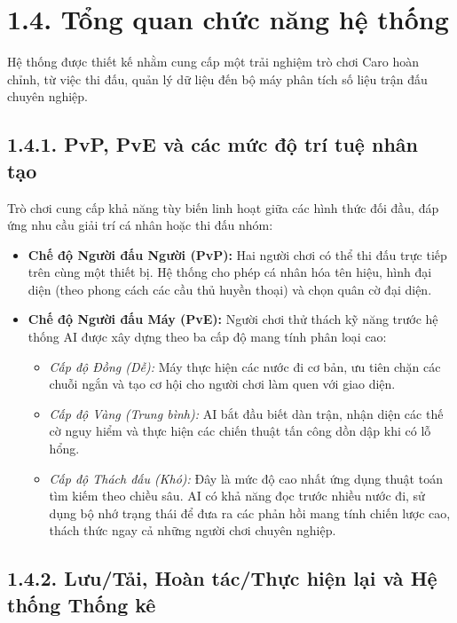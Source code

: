 \section*{1.4. Tổng quan chức năng hệ thống}

\noindent \indent Hệ thống được thiết kế nhằm cung cấp một trải nghiệm trò chơi Caro hoàn chỉnh, từ việc thi đấu, quản lý dữ liệu đến bộ máy phân tích số liệu trận đấu chuyên nghiệp.

\subsection*{1.4.1. PvP, PvE và các mức độ trí tuệ nhân tạo}

\noindent \indent Trò chơi cung cấp khả năng tùy biến linh hoạt giữa các hình thức đối đầu, đáp ứng nhu cầu giải trí cá nhân hoặc thi đấu nhóm:

\begin{itemize}
    \item \textbf{Chế độ Người đấu Người (PvP):} Hai người chơi có thể thi đấu trực tiếp trên cùng một thiết bị. Hệ thống cho phép cá nhân hóa tên hiệu, hình đại diện (theo phong cách các cầu thủ huyền thoại) và chọn quân cờ đại diện.
    \item \textbf{Chế độ Người đấu Máy (PvE):} Người chơi thử thách kỹ năng trước hệ thống AI được xây dựng theo ba cấp độ mang tính phân loại cao:
    \begin{itemize}
        \item \textit{Cấp độ Đồng (Dễ):} Máy thực hiện các nước đi cơ bản, ưu tiên chặn các chuỗi ngắn và tạo cơ hội cho người chơi làm quen với giao diện.
        \item \textit{Cấp độ Vàng (Trung bình):} AI bắt đầu biết dàn trận, nhận diện các thế cờ nguy hiểm và thực hiện các chiến thuật tấn công dồn dập khi có lỗ hổng.
        \item \textit{Cấp độ Thách đấu (Khó):} Đây là mức độ cao nhất ứng dụng thuật toán tìm kiếm theo chiều sâu. AI có khả năng đọc trước nhiều nước đi, sử dụng bộ nhớ trạng thái để đưa ra các phản hồi mang tính chiến lược cao, thách thức ngay cả những người chơi chuyên nghiệp.
    \end{itemize}
\end{itemize}

\subsection*{1.4.2. Lưu/Tải, Hoàn tác/Thực hiện lại và Hệ thống Thống kê}

